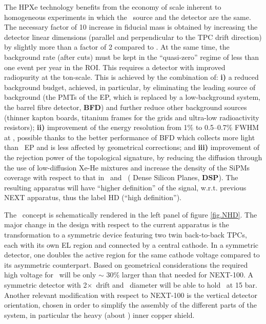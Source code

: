 
 The HPXe technology benefits from the economy of scale inherent to homogeneous experiments in which the \bbonu\ source and the detector are the same. The necessary factor of 10 increase in fiducial mass is obtained by increasing the detector linear dimensions (parallel and perpendicular to the TPC drift direction) by slightly more than a factor of 2 compared to \NEXT. At the same time, the background rate (after cuts) must be kept in the ``quasi-zero'' regime of less than one event per year in the ROI. This requires a detector with improved radiopurity at the ton-scale. This is achieved by the combination of: {\bf i)} a reduced background budget, achieved, in particular, by eliminating the leading source of background (the PMTs of the EP, which is replaced by a low-background system, the barrel fibre detector, {\bf BFD}) and further reduce other background sources (thinner kapton boards, titanium frames for the grids and ultra-low radioactivity resistors);  {\bf ii)} improvement of the energy resolution from 1\% to 0.5--0.7\% FWHM at \Qbb, possible thanks to the better  performance of BFD which collects more light than \Next\ EP and is less affected by geometrical corrections; and {\bf iii)} improvement of the rejection power of the topological signature, by reducing the diffusion through the use of low-diffusion Xe-He mixtures and increase the density of the SiPMs coverage with respect to that in \NEW\ and \Next\ ( Dense Silicon Planes, {\bf DSP}). The resulting apparatus will have ``higher definition'' of the signal, w.r.t. previous NEXT apparatus, thus the label HD (``high definition''). 
 
 \indent
 
The \NHD\ concept is schematically rendered in the left panel of figure \ref{fig.NHD}. %
The major change in the design with respect to the current apparatus is the transformation to a symmetric device featuring two twin back-to-back TPCs, each  with its own EL region and connected by a central cathode. In a symmetric detector, one doubles the active region for the same cathode voltage compared to its asymmetric counterpart.  Based on geometrical considerations the required high voltage for \NHD\ will be only $\sim$ 30\% larger than that needed for NEXT-100. A symmetric detector with 2$\times$\XHDL\ drift and \XHDD\ diameter will be able to hold \XHDM\ at 15 bar. Another relevant modification with respect to NEXT-100 is the vertical detector orientation, chosen in order to simplify the assembly of the different parts of the system, in particular the heavy (about \XHDS) inner copper shield. 

